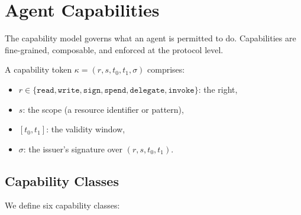 

\section{Agent Capabilities}
\label{sec:capabilities}

The capability model governs what an agent is permitted to do. Capabilities are fine-grained, composable, and enforced at the protocol level.

\begin{definition}
A capability token $\kappa = (r, s, t_0, t_1, \sigma)$ comprises:
\begin{itemize}
    \item $r \in \{\texttt{read}, \texttt{write}, \texttt{sign}, \texttt{spend}, \texttt{delegate}, \texttt{invoke}\}$: the right,
    \item $s$: the scope (a resource identifier or pattern),
    \item $[t_0, t_1]$: the validity window,
    \item $\sigma$: the issuer's signature over $(r, s, t_0, t_1)$.
\end{itemize}
\end{definition}

\subsection{Capability Classes}

We define six capability classes:

